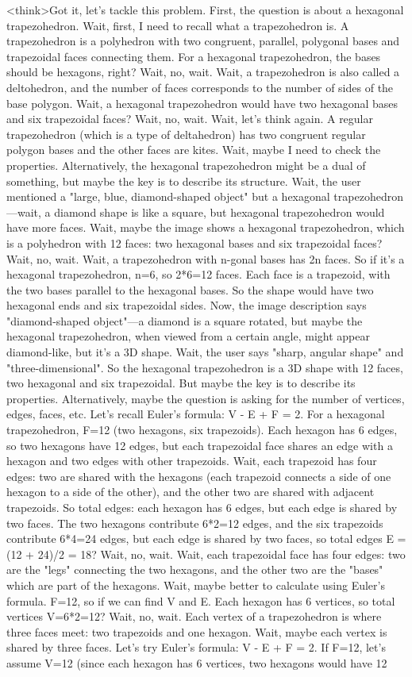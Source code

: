<think>Got it, let's tackle this problem. First, the question is about a hexagonal trapezohedron. Wait, first, I need to recall what a trapezohedron is. A trapezohedron is a polyhedron with two congruent, parallel, polygonal bases and trapezoidal faces connecting them. For a hexagonal trapezohedron, the bases should be hexagons, right? Wait, no, wait. Wait, a trapezohedron is also called a deltohedron, and the number of faces corresponds to the number of sides of the base polygon. Wait, a hexagonal trapezohedron would have two hexagonal bases and six trapezoidal faces? Wait, no, wait. Wait, let's think again. A regular trapezohedron (which is a type of deltahedron) has two congruent regular polygon bases and the other faces are kites. Wait, maybe I need to check the properties. Alternatively, the hexagonal trapezohedron might be a dual of something, but maybe the key is to describe its structure. Wait, the user mentioned a "large, blue, diamond-shaped object" but a hexagonal trapezohedron—wait, a diamond shape is like a square, but hexagonal trapezohedron would have more faces. Wait, maybe the image shows a hexagonal trapezohedron, which is a polyhedron with 12 faces: two hexagonal bases and six trapezoidal faces? Wait, no, wait. Wait, a trapezohedron with n-gonal bases has 2n faces. So if it's a hexagonal trapezohedron, n=6, so 2*6=12 faces. Each face is a trapezoid, with the two bases parallel to the hexagonal bases. So the shape would have two hexagonal ends and six trapezoidal sides. Now, the image description says "diamond-shaped object"—a diamond is a square rotated, but maybe the hexagonal trapezohedron, when viewed from a certain angle, might appear diamond-like, but it's a 3D shape. Wait, the user says "sharp, angular shape" and "three-dimensional". So the hexagonal trapezohedron is a 3D shape with 12 faces, two hexagonal and six trapezoidal. But maybe the key is to describe its properties. Alternatively, maybe the question is asking for the number of vertices, edges, faces, etc. Let's recall Euler's formula: V - E + F = 2. For a hexagonal trapezohedron, F=12 (two hexagons, six trapezoids). Each hexagon has 6 edges, so two hexagons have 12 edges, but each trapezoidal face shares an edge with a hexagon and two edges with other trapezoids. Wait, each trapezoid has four edges: two are shared with the hexagons (each trapezoid connects a side of one hexagon to a side of the other), and the other two are shared with adjacent trapezoids. So total edges: each hexagon has 6 edges, but each edge is shared by two faces. The two hexagons contribute 6*2=12 edges, and the six trapezoids contribute 6*4=24 edges, but each edge is shared by two faces, so total edges E = (12 + 24)/2 = 18? Wait, no, wait. Wait, each trapezoidal face has four edges: two are the "legs" connecting the two hexagons, and the other two are the "bases" which are part of the hexagons. Wait, maybe better to calculate using Euler's formula. F=12, so if we can find V and E. Each hexagon has 6 vertices, so total vertices V=6*2=12? Wait, no, wait. Each vertex of a trapezohedron is where three faces meet: two trapezoids and one hexagon. Wait, maybe each vertex is shared by three faces. Let's try Euler's formula: V - E + F = 2. If F=12, let's assume V=12 (since each hexagon has 6 vertices, two hexagons would have 12 